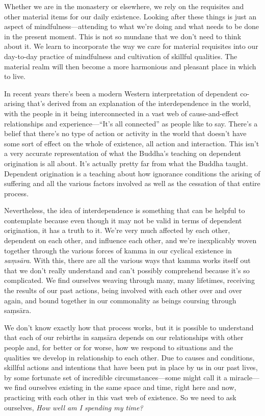 Whether we are in the monastery or elsewhere, we rely on the requisites 
and other material items for our daily existence. Looking after these 
things is just an aspect of mindfulness---attending to what we're doing 
and what needs to be done in the present moment. This is not so mundane 
that we don't need to think about it. We learn to incorporate the way 
we care for material requisites into our day-to-day practice of 
mindfulness and cultivation of skillful qualities. The material realm 
will then become a more harmonious and pleasant place in which to live.


In recent years there's been a modern Western interpretation of 
dependent co-arising that's derived from an explanation of the 
interdependence in the world, with the people in it being 
interconnected in a vast web of cause-and-effect relationships and 
experience---``It's all connected'' as people like to say. There's a 
belief that there's no type of action or activity in the world that 
doesn't have some sort of effect on the whole of existence, all action 
and interaction. This isn't a very accurate representation of what the 
Buddha's teaching on dependent origination is all about. It's actually 
pretty far from what the Buddha taught. Dependent origination is a 
teaching about how ignorance conditions the arising of suffering and 
all the various factors involved as well as the cessation of that 
entire process.

Nevertheless, the idea of interdependence is something that can be 
helpful to contemplate because even though it may not be valid in terms 
of dependent origination, it has a truth to it. We're very much 
affected by each other, dependent on each other, and influence each 
other, and we're inexplicably woven together through the various forces 
of kamma in our cyclical existence in \emph{saṃsāra}. With this, 
there are all the various ways that kamma works itself out that we 
don't really understand and can't possibly comprehend because it's so 
complicated. We find ourselves weaving through many, many lifetimes, 
receiving the results of our past actions, being involved with each 
other over and over again, and bound together in our commonality as 
beings coursing through saṃsāra.

We don't know exactly how that process works, but it is possible to 
understand that each of our rebirths in saṃsāra depends on our 
relationships with other people and, for better or for worse, how we 
respond to situations and the qualities we develop in relationship to 
each other. Due to causes and conditions, skillful actions and 
intentions that have been put in place by us in our past lives, by some 
fortunate set of incredible circumstances---some might call it a 
miracle---we find ourselves existing in the same space and time, right 
here and now, practicing with each other in this vast web of existence. 
So we need to ask ourselves, \emph{How well am I spending my time?}


